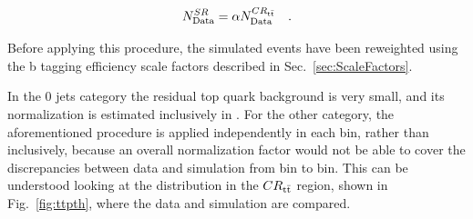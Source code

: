 \begin{equation}
N_\mathrm{Data}^{SR} = \alpha N_\mathrm{Data}^{CR_{\mathrm{t}\bar{\mathrm{t}}}} \quad .
\end{equation}

Before applying this procedure, the simulated events have been reweighted using the b tagging efficiency scale factors described in Sec.~\ref{sec:ScaleFactors}.

In the 0 jets category the residual top quark background is very small, and its normalization is estimated inclusively in \pth. For the other category, the aforementioned procedure is applied independently in each \pth bin, rather than inclusively, because an overall normalization factor would not be able to cover the discrepancies between data and simulation from bin to bin. This can be understood looking at the \pth distribution in the $CR_{\mathrm{t}\bar{\mathrm{t}}}$ region, shown in Fig.~\ref{fig:ttpth}, where the data and simulation are compared.

